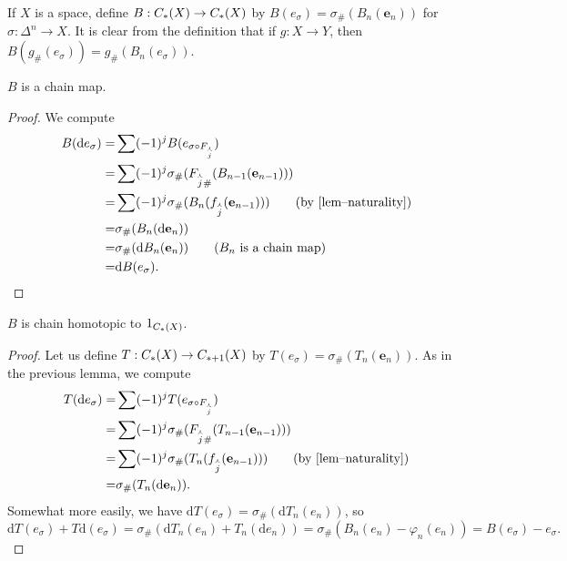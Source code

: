 \documentclass[a4paper,11pt]{article}
\begin{document}
				If $X$ is a space, define $B:\cx{X}\rightarrow \cx{X}$ by $B(e_\sigma)=\sigma_\#(B_n(\textbf{e}_n))$ for $\sigma:\Delta^n\rightarrow X$. It is clear from the definition that if $g:X\rightarrow Y$, then $B(g_\#(e_\sigma))=g_\#(B_n(e_\sigma))$.

				\begin{lemma}
					$B$ is a chain map.
				\end{lemma}
				\begin{proof}
					We compute
					\begin{align*}
						B(\mathrm{d}e_\sigma)=&\sum(-1)^jB(e_{\sigma\circ F_{\overset{\curlywedge}{j}}})\\
						=&\sum(-1)^j\sigma_{\#}(F_{\overset{\curlywedge}{j}\#}(B_{n-1}(\textbf{e}_{n-1})))\\
						=&\sum(-1)^j\sigma_{\#}(B_n(f_{\overset{\curlywedge}{j}}(\textbf{e}_{n-1})))\qquad\text{(by \autoref{lem--naturality})}\\
						=&\sigma_{\#}(B_n(\mathrm{d}\textbf{e}_n))\\
						=&\sigma_{\#}(\mathrm{d}B_n(\textbf{e}_n))\qquad\text{($B_n$ is a chain map)}\\
						=&\mathrm{d}B(e_\sigma).
					\end{align*}
				\end{proof}

				\begin{lemma}
					$B$ is chain homotopic to $1_{\cx{X}}$.
				\end{lemma}
				\begin{proof}
					Let us define $T:\cx{X}\rightarrow\cx[\ast+1]{X}$ by $T(e_\sigma)=\sigma_{\#}(T_n(\textbf{e}_n))$. As in the previous lemma, we compute
					\begin{align*}
						T(\mathrm{d}e_\sigma)=&\sum(-1)^jT(e_{\sigma\circ F_{\overset{\curlywedge}{j}}})\\
						=&\sum(-1)^j\sigma_{\#}(F_{\rmv{j}\#}(T_{n-1}(\textbf{e}_{n-1})))\\
						=&\sum(-1)^j\sigma_{\#}(T_n(f_{\rmv{j}}(\textbf{e}_{n-1})))\qquad\text{(by \autoref{lem--naturality})}\\
						=&\sigma_{\#}(T_n(\mathrm{d}\textbf{e}_n)).
					\end{align*}
					Somewhat more easily, we have $\mathrm{d}T(e_\sigma)=\sigma_{\#}(\mathrm{d}T_n(e_n))$, so
					\begin{equation*}
						\mathrm{d}T(e_\sigma)+T\mathrm{d}(e_\sigma)=\sigma_{\#}(\mathrm{d}T_n(e_n)+T_n(\mathrm{d}e_n))=\sigma_{\#}(B_n(e_n)-\varphi_n(e_n))=B(e_\sigma)-e_\sigma.
					\end{equation*}
				\end{proof}
\end{document}

